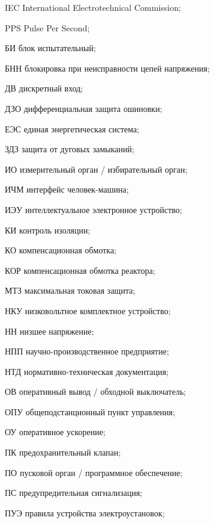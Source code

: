 \begin{list}{}%
{%
  \setlength{\labelwidth}{\abbrwidth}%
  \setlength{\labelsep}{0pt}%
  \setlength{\leftmargin}{\dimexpr\labelwidth+\labelsep\relax}%
  \setlength{\itemindent}{0pt}%
  \setlength{\parsep}{0pt}%
  \setlength{\itemsep}{0pt}
  \renewcommand{\makelabel}[1]{#1 --\hspace{\abbrgap}}%
}
\item[IEC]  International Electrotechnical Commission;
\item[PPS] Pulse Per Second;
\item[БИ] блок испытательный;
\item[БНН] блокировка при неисправности цепей напряжения;
\item[ДВ] дискретный вход;
\item[ДЗО] дифференциальная защита ошиновки;
\item[ЕЭС] единая энергетическая система;
\item[ЗДЗ] защита от дуговых замыканий;
\item[ИО] измерительный орган / избирательный орган;
\item[ИЧМ] интерфейс человек-машина;
\item[ИЭУ] интеллектуальное электронное устройство;
\item[КИ] контроль изоляции;
\item[КО] компенсационная обмотка;
\item[КОР] компенсационная обмотка реактора;
\item[МТЗ] максимальная токовая защита;
\item[НКУ] низковольтное комплектное устройство;
\item[НН] низшее напряжение;
\item[НПП] научно-производственное предприятие;
\item[НТД] нормативно-техническая документация;
\item[ОВ] оперативный вывод / обходной выключатель;
\item[ОПУ] общеподстанционный пункт управления;
\item[ОУ] оперативное ускорение;
\item[ПК] предохранительный клапан;
\item[ПО] пусковой орган / программное обеспечение;
\item[ПС] предупредительная сигнализация;
\item[ПУЭ] правила устройства электроустановок;

\end{list}
